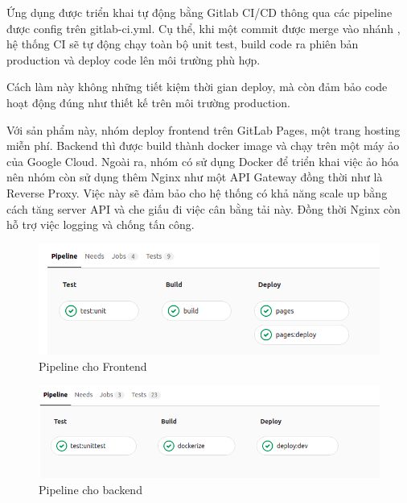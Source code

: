 \documentclass[./../main.tex]{subfiles}
\begin{document}
Ứng dụng được triển khai tự động bằng Gitlab CI/CD thông qua các pipeline được config trên gitlab-ci.yml. Cụ thể, khi một commit được merge vào nhánh , hệ thống CI sẽ tự động chạy toàn bộ unit test, build code ra phiên bản production và deploy code lên môi trường phù hợp.

Cách làm này không những tiết kiệm thời gian deploy, mà còn đảm bảo code hoạt động đúng như thiết kế trên môi trường production.

Với sản phẩm này, nhóm deploy frontend trên GitLab Pages, một trang hosting miễn phí.
Backend thì được build thành docker image và chạy trên một máy ảo của Google Cloud.
Ngoài ra, nhóm có sử dụng Docker để triển khai việc ảo hóa nên nhóm còn sử dụng thêm Nginx như một API Gateway đồng thời như
 là Reverse Proxy. Việc này sẽ đảm bảo cho hệ thống có khả năng scale up bằng cách tăng server API và che giấu đi việc cân
  bằng tải này. Đồng thời Nginx còn hỗ trợ việc logging và chống tấn công.

\begin{figure}[H]
	\centering
	\includegraphics[width=\linewidth]{./images/pipeline_1.png}
	\caption{Pipeline cho Frontend}
\end{figure}

\begin{figure}[H]
	\centering
	\includegraphics[width=\linewidth]{./images/pipeline_2.png}
	\caption{Pipeline cho backend}
\end{figure}
\end{document}
